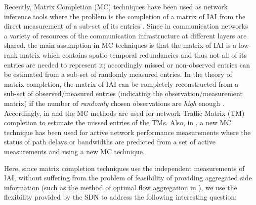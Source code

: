 Recently, Matrix Completion (MC) techniques have been used as network inference tools where the problem is the completion of a matrix of IAI from the direct measurement of a sub-set of its entries \cite{Roughan:2012}\cite{Gursun:2011}\cite{YLiao:2011}. Since in communication networks a variety of resources of the communication infrastructure at different layers are shared, the main assumption in MC techniques is that the matrix of IAI is a low-rank matrix which contains spatio-temporal redundancies and thus not all of its entries are needed to represent it; accordingly missed or non-observed entries can be estimated from a sub-set of randomly measured entries. In the theory of matrix completion, the matrix of IAI can be completely reconstructed from a sub-set of observed/measured entries (indicating the observation/measurement matrix) if the number of \emph{randomly} chosen observations are \emph{high} enough \cite{Candes:2009}\cite{Candes:2010}. Accordingly, in \cite{Roughan:2012} and \cite{Gursun:2011} the MC methods are used for network Traffic Matrix (TM) completion to estimate the missed entries of the TMs. Also, in \cite{YLiao:2011}, a new MC technique has been used for active network performance measurements where the status of path delays or bandwidths are predicted from a set of active measurements and using a new MC technique.



Here, since matrix completion techniques use the independent measurements of IAI, without suffering from the problem of feasibility of providing aggregated side information (such as the method of optimal flow aggregation in \cite{IF14iSTAMP:2014}), we use the flexibility provided by the SDN to address the following interesting question:

